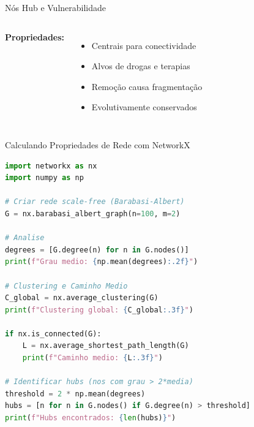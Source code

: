 \begin{frame}[shrink=20]{Nós Hub e Vulnerabilidade}
\begin{columns}

\vspace{0.3cm}

\textbf{Propriedades:}
\begin{itemize}
    \item Centrais para conectividade
    \item Alvos de drogas e terapias
    \item Remoção causa fragmentação
    \item Evolutivamente conservados
\end{itemize}

\begin{center}
\end{center}
\end{columns}

\vspace{0.3cm}

\end{frame}

\begin{frame}[fragile, shrink=30]{Calculando Propriedades de Rede com NetworkX}
\begin{lstlisting}[language=Python, basicstyle=\ttfamily\footnotesize]
import networkx as nx
import numpy as np

# Criar rede scale-free (Barabasi-Albert)
G = nx.barabasi_albert_graph(n=100, m=2)

# Analise
degrees = [G.degree(n) for n in G.nodes()]
print(f"Grau medio: {np.mean(degrees):.2f}")

# Clustering e Caminho Medio
C_global = nx.average_clustering(G)
print(f"Clustering global: {C_global:.3f}")

if nx.is_connected(G):
    L = nx.average_shortest_path_length(G)
    print(f"Caminho medio: {L:.3f}")

# Identificar hubs (nos com grau > 2*media)
threshold = 2 * np.mean(degrees)
hubs = [n for n in G.nodes() if G.degree(n) > threshold]
print(f"Hubs encontrados: {len(hubs)}")
\end{lstlisting}
\end{frame}

